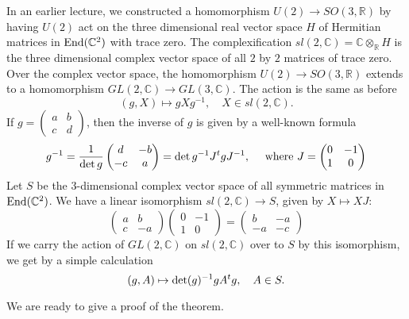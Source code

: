 \documentclass{llncs}
\def\op#1{{\hbox{#1}}}
\newcommand{\ring}[1]{\mathbb{#1}}
\def\t#1{\hbox{}^t#1}
\begin{document}
In an earlier lecture, we constructed a homomorphism $U(2)\to
SO(3,\ring{R})$ by having $U(2)$ act on the three dimensional real
vector space $H$ of Hermitian matrices in $\op{End}(\ring{C}^2)$ with
trace zero.  The complexification
$sl(2,\ring{C})=\ring{C}\otimes_{\ring{R}} H$ is the three dimensional
complex vector space of all $2$ by $2$
matrices of trace zero.  Over the complex vector space, the
homomorphism $U(2)\to SO(3,\ring{R})$ extends to a homomorphism
$GL(2,\ring{C})\to GL(3,\ring{C})$.  The action is the same as before
\[
(g,X)\mapsto g X g^{-1},\quad X\in sl(2,\ring{C}).
\]
If $g = \begin{pmatrix} a& b\\ c & d\end{pmatrix}$, then the inverse
of $g$ is given by a well-known formula
\[
g^{-1} = \frac{1}{\det{g}}\begin{pmatrix} d & - b \\ -c & a\end{pmatrix} 
= \det g^{-1} J \t{g} J^{-1}, \quad
\hbox{ where } J = \begin{pmatrix} 0 & -1 \\ 1 &0 \end{pmatrix}
\]
Let $S$ be the $3$-dimensional complex vector space of all symmetric matrices in $\op{End}(\ring{C}^2)$.
We have a linear isomorphism $sl(2,\ring{C})\to S$, given by $X\mapsto X J$:
\[
\begin{pmatrix} a& b\\c & -a\end{pmatrix} \begin{pmatrix} 0& -1 \\1 &0\end{pmatrix} = 
\begin{pmatrix} b & -a \\ -a & -c \end{pmatrix}
\]
If we carry the action of $GL(2,\ring{C})$ on $sl(2,\ring{C})$
over to $S$ by this isomorphism, we get by a simple calculation
\[
(g,A) \mapsto \det(g)^{-1} g A \t{g},\quad A \in S.
\]

We are ready to give a proof of the theorem.
\end{document}
